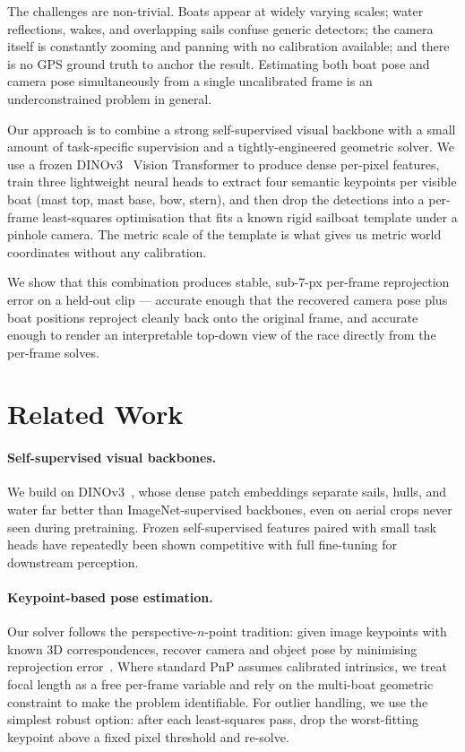 \documentclass[10pt,twocolumn,letterpaper]{article}
\begin{document}
The challenges are non-trivial.  Boats appear at widely varying scales; water reflections, wakes, and overlapping sails confuse generic detectors; the camera itself is constantly zooming and panning with no calibration available; and there is no GPS ground truth to anchor the result.  Estimating both boat pose and camera pose simultaneously from a single uncalibrated frame is an underconstrained problem in general.

Our approach is to combine a strong self-supervised visual backbone with a small amount of task-specific supervision and a tightly-engineered geometric solver.  We use a frozen DINOv3~\cite{Oquab2023} Vision Transformer to produce dense per-pixel features, train three lightweight neural heads to extract four semantic keypoints per visible boat (mast top, mast base, bow, stern), and then drop the detections into a per-frame least-squares optimisation that fits a known rigid sailboat template under a pinhole camera.  The metric scale of the template is what gives us metric world coordinates without any calibration.

We show that this combination produces stable, sub-7-px per-frame reprojection error on a held-out clip --- accurate enough that the recovered camera pose plus boat positions reproject cleanly back onto the original frame, and accurate enough to render an interpretable top-down view of the race directly from the per-frame solves.

\section{Related Work}

\paragraph{Self-supervised visual backbones.}
We build on DINOv3~\cite{Oquab2023}, whose dense patch embeddings separate sails, hulls, and water far better than ImageNet-supervised backbones, even on aerial crops never seen during pretraining.  Frozen self-supervised features paired with small task heads have repeatedly been shown competitive with full fine-tuning for downstream perception.

\paragraph{Keypoint-based pose estimation.}
Our solver follows the perspective-$n$-point tradition: given image keypoints with known 3D correspondences, recover camera and object pose by minimising reprojection error~\cite{Hartley2003}.  Where standard PnP assumes calibrated intrinsics, we treat focal length as a free per-frame variable and rely on the multi-boat geometric constraint to make the problem identifiable.  For outlier handling, we use the simplest robust option: after each least-squares pass, drop the worst-fitting keypoint above a fixed pixel threshold and re-solve.
\end{document}

